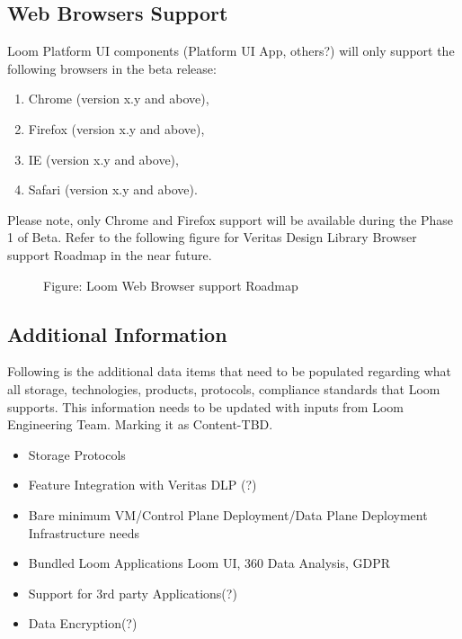 \documentclass[letterpaper,10pt,english]{sphinxmanual}
\begin{document}
\subsection{Web Browsers Support}
\label{\detokenize{loom_getting_started_guide:web-browser-version}}\label{\detokenize{loom_getting_started_guide:web-browsers-support}}
Loom Platform UI components (Platform UI App, others?) will only support the following browsers in the beta release:
\begin{enumerate}
\item {} 
Chrome (version x.y and above),

\item {} 
Firefox (version x.y and above),

\item {} 
IE (version x.y and above),

\item {} 
Safari (version x.y and above).

\end{enumerate}

Please note, only Chrome and Firefox support will be available during the Phase 1 of Beta. Refer to the following figure for Veritas Design Library Browser support Roadmap in the near future.

\begin{figure}[htbp]
\centering
\capstart

\noindent{}
\caption{Figure: Loom Web Browser support Roadmap}\label{\detokenize{loom_getting_started_guide:id49}}\end{figure}


\subsection{Additional Information}
\label{\detokenize{loom_getting_started_guide:additional-information}}\label{\detokenize{loom_getting_started_guide:content-mcdmp-additional-specs}}
Following is the additional data items that need to be populated regarding what all storage, technologies, products, protocols, compliance standards that Loom supports.  This information needs to be updated with inputs from Loom Engineering Team. Marking it as Content-TBD.
\begin{itemize}
\item {} 
Storage Protocols

\item {} 
Feature Integration with Veritas DLP (?)

\item {} 
Bare minimum VM/Control Plane Deployment/Data Plane Deployment Infrastructure needs

\item {} 
Bundled Loom Applications \textendash{} Loom UI, 360 Data Analysis, GDPR

\item {} 
Support for 3rd party Applications(?)

\item {} 
Data Encryption(?)

\end{itemize}
\end{document}

